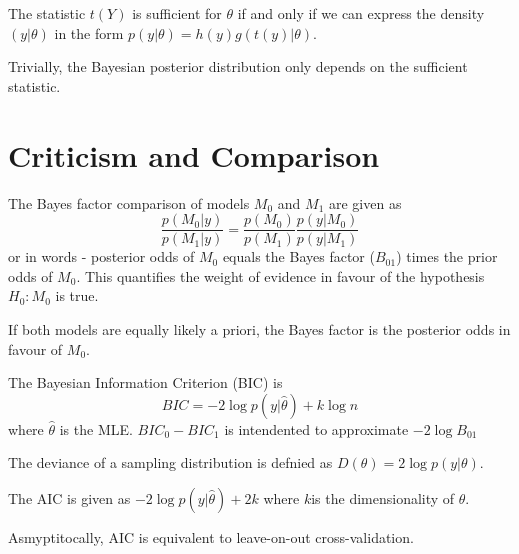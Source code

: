 \begin{thm}
  \label{sec:sampl-prop-relat-5}
  The statistic $t(Y)$ is sufficient for $\theta$ if and only if we
  can express the density $(y | \theta)$ in the form $p(y | \theta) = 
  h(y) g(t(y) | \theta)$.

  Trivially, the Bayesian posterior distribution only depends on the
  sufficient statistic.
\end{thm}

\section{Criticism and Comparison}
\label{sec:criticism-comparison}

\begin{defn}
  \label{sec:criticism-comparison-1}
  The Bayes factor comparison of models $M_{0}$ and $M_{1}$ are given
  as
  \begin{equation}
    \label{eq:19}
    \frac{p(M_{0} | y)}{p(M_{1} | y)} = \frac{p(M_{0})}{p(M_{1})}
    \frac{p(y | M_{0})}{p(y | M_{1})}
  \end{equation}
  or in words - posterior odds of $M_{0}$ equals the Bayes factor ($B_{01}$)
  times the prior odds of $M_{0}$.  This quantifies the weight of
  evidence in favour of the hypothesis $H_{0}: M_{0}$ is true.

  If both models are equally likely a priori, the Bayes factor is the
  posterior odds in favour of $M_{0}$.
\end{defn}

\begin{defn}
  \label{sec:criticism-comparison-2}
  The Bayesian Information Criterion (BIC) is
  \begin{equation}
    \label{eq:20}
    BIC = -2 \log p(y | \hat \theta) + k \log n
  \end{equation} where $\hat \theta$ is the MLE.
  $BIC_{0} - BIC_{1}$ is intendented to approximate $-2 \log B_{01}$
\end{defn}

\begin{defn}
  \label{sec:criticism-comparison-3}
  The deviance of a sampling distribution is defnied as $D(\theta) = 2
  \log p(y | \theta)$.
\end{defn}

\begin{defn}
  \label{sec:criticism-comparison-4}
  The AIC is given as $-2 \log p(y | \hat \theta) + 2k$ where $k$is
  the dimensionality of $\theta$.

  Asmyptitocally, AIC is equivalent to leave-on-out cross-validation.
\end{defn}

